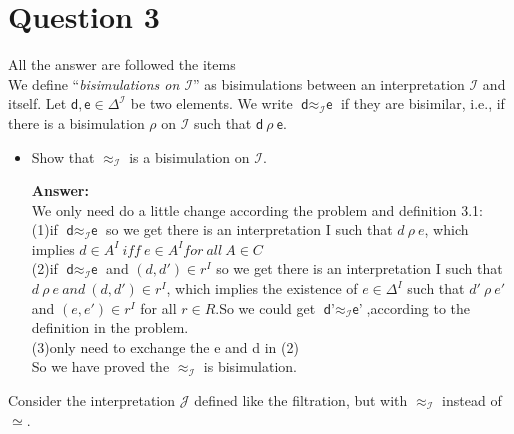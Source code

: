 \documentclass{article}
\begin{document}
    \section{Question 3}
    All the answer are followed the items\\
    We define ``\emph{bisimulations on $\mathcal{I}$}'' as bisimulations between an interpretation $\mathcal{I}$ and itself. Let $\textsf{d},\textsf{e}\in\Delta^{\mathcal{I}}$ be two elements. We write $\textsf{d}\approx_{\mathcal{I}}\textsf{e}$ if they are bisimilar, i.e., if there is a bisimulation $\rho$ on $\mathcal{I}$ such that $\textsf{d}~\rho~\textsf{e}$.
    \begin{itemize}
        \item Show that $\approx_{\mathcal{I}}$ is a bisimulation on $\mathcal{I}$.
        
        \textbf{Answer:}\\
        We only need do a little change according the problem and definition 3.1:\\
        (1)if $\textsf{d}\approx_{\mathcal{I}}\textsf{e}$ so we get there is an interpretation I such that $d \ \rho \ e$,
        which implies $d \in A^I\ iff\ e \in A^I for\ all\ A \in C$\\
        (2)if $\textsf{d}\approx_{\mathcal{I}}\textsf{e}$ and $(d,d') \in r^I$ so we get there is an interpretation I such that $d \ \rho \ e \ and\ (d,d') \in r^I$,
        which implies the existence of $e \in \Delta^I$ such that $d'\ \rho\ e' $ and $(e,e') \in r^I$ for all $r \in R$.So we could get $\textsf{d'}\approx_{\mathcal{I}}\textsf{e'}$,according to the definition in the problem.\\
        (3)only need to exchange the e and d in (2)\\
        So we have proved the $\approx_{\mathcal{I}}$ is bisimulation.\\  

    \end{itemize}
    Consider the interpretation $\mathcal{J}$ defined like the filtration, but with $\approx_{\mathcal{I}}$ instead of $\simeq$.
\end{document}
